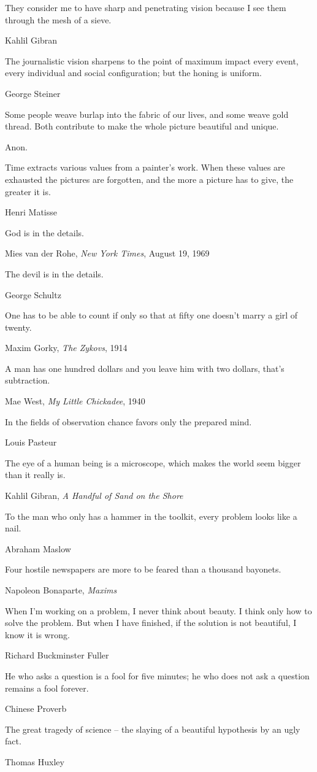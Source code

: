 \epigraph{They consider me to have sharp and penetrating vision because I see them through the mesh of a sieve.}{Kahlil Gibran}

\epigraph{The journalistic vision sharpens to the point of maximum impact every event, every individual and social configuration; but the honing is uniform.}{George Steiner}

\epigraph{Some people weave burlap into the fabric of our lives, and some weave gold thread. Both contribute to make the whole picture beautiful and unique.}{Anon.}

\epigraph{Time extracts various values from a painter's work. When these values are exhausted the pictures are forgotten, and the more a picture has to give, the greater it is.}{Henri Matisse}

\epigraph{God is in the details.}{Mies van der Rohe, \emph{New York Times}, August 19, 1969}

\epigraph{The devil is in the details.}{George Schultz} %

\epigraph{One has to be able to count if only so that at fifty one doesn't marry a girl of twenty.}{Maxim Gorky, \emph{The Zykovs}, 1914}

\epigraph{A man has one hundred dollars and you leave him with two dollars, that's subtraction.}{Mae West, \emph{My Little Chickadee}, 1940}

\epigraph{In the fields of observation chance favors only the prepared mind.}{Louis Pasteur}

\epigraph{The eye of a human being is a microscope, which makes the world seem bigger than it really is.}{Kahlil Gibran, \emph{A Handful of Sand on the Shore}}

\epigraph{To the man who only has a hammer in the toolkit, every problem looks like a nail.}{Abraham Maslow}

\epigraph{Four hostile newspapers are more to be feared than a thousand bayonets.}{Napoleon Bonaparte, \emph{Maxims}}

\epigraph{When I'm working on a problem, I never think about beauty. I think only how to solve the problem. But when I have finished, if the solution is not beautiful, I know it is wrong.}{Richard Buckminster Fuller}

\epigraph{He who asks a question is a fool for five minutes; he who does not ask a question remains a fool forever.}{Chinese Proverb}

\epigraph{The great tragedy of science -- the slaying of a beautiful hypothesis by an ugly fact.}{Thomas Huxley}

